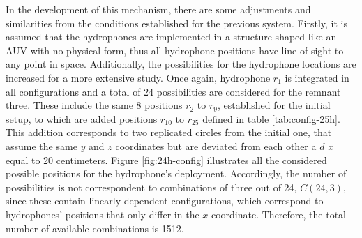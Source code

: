 In the development of this mechanism, there are some adjustments and similarities from the conditions established for the previous system. Firstly, it is assumed that the hydrophones are implemented in a structure shaped like an AUV with no physical form, thus all hydrophone positions have line of sight to any point in space. Additionally, the possibilities for the hydrophone locations are increased for a more extensive study. Once again, hydrophone $r_1$ is integrated in all configurations and a total of 24 possibilities are considered for the remnant three. These include the same 8 positions $r_2$ to $r_9$, established for the initial setup, to which are added positions $r_{10}$ to $r_{25}$ defined in table \ref{tab:config-25h}. This addition corresponds to two replicated circles from the initial one, that assume the same $y$ and $z$ coordinates but are deviated from each other a $d\_x$ equal to 20 centimeters. Figure \ref{fig:24h-config} illustrates all the considered possible positions for the hydrophone's deployment. Accordingly, the number of possibilities is not correspondent to combinations of three out of 24, $C(24,3)$, since these contain linearly dependent configurations, which correspond to hydrophones' positions that only differ in the $x$ coordinate. Therefore, the total number of available combinations is 1512.

\begin{table}[!htbp] %
	\begin{center}
		\caption{Additional coordinates for an implementation with 25 hydrophones}
		\label{tab:config-25h}
	\end{center}
\end{table}

